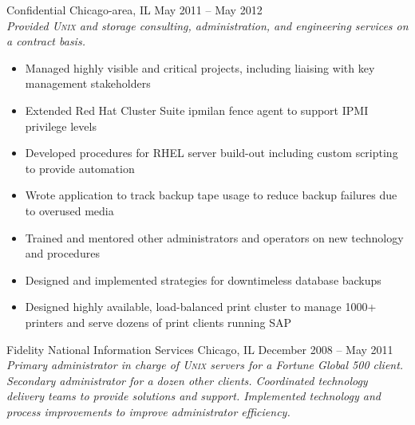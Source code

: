 \documentclass[9pt]{extarticle} %
\begin{document}
\begin{minipage}[c]{\textwidth}

	\begin{indented}
		Confidential \tab Chicago-area, IL \tab May 2011 -- May 2012\\
		\textit{Provided \textsc{Unix} and storage consulting, administration, and engineering services on a contract basis.}
                \begin{itemize}
                        \item Managed highly visible and critical projects, including liaising with key management stakeholders
                        \item Extended Red Hat Cluster Suite ipmilan fence agent to support IPMI privilege levels
                        \item Developed procedures for RHEL server build-out including custom scripting to provide automation
                        \item Wrote application to track backup tape usage to reduce backup failures due to overused media
                        \item Trained and mentored other administrators and operators on new technology and procedures
                        \item Designed and implemented strategies for downtimeless database backups
                        \item Designed highly available, load-balanced print cluster to manage 1000+ printers and serve dozens of print clients running SAP

		\end{itemize}
	\end{indented}
\end{minipage}

\bigskip


\begin{minipage}[c]{\textwidth}
	\jobtitle{Systems Administrator}

	\begin{indented}
		Fidelity National Information Services \tab Chicago, IL \tab December 2008 -- May 2011\\
		\textit{Primary administrator in charge of \textsc{Unix} servers for a Fortune Global 500 client. Secondary administrator for a dozen other clients. Coordinated technology delivery teams to provide solutions and support. Implemented technology and process improvements to improve administrator efficiency.}
	\end{indented}
\end{minipage}
\end{document}
